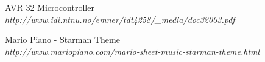 \renewcommand{\refname} {References}
\begin{thebibliography}{15}  %
 AVR 32 Microcontroller\\
	\emph{http://www.idi.ntnu.no/emner/tdt4258/\_media/doc32003.pdf}

 Mario Piano - Starman Theme\\
	\emph{http://www.mariopiano.com/mario-sheet-music-starman-theme.html}


\end{thebibliography}
